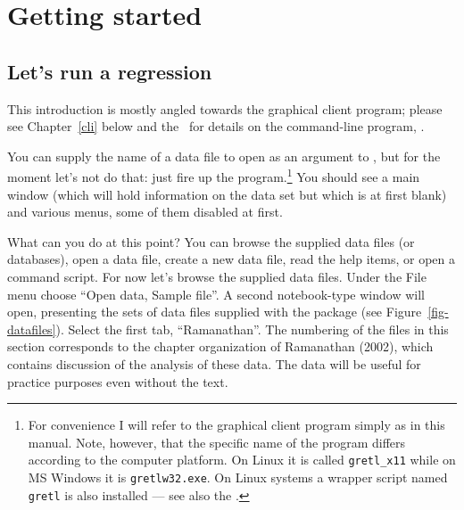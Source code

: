 \chapter{Getting started}
\label{getting-started}


\section{Let's run a regression}
\label{starting-regression}

This introduction is mostly angled towards the graphical client
program; please see Chapter~\ref{cli} below and the \GCR\ for details
on the command-line program, .
    
You can supply the name of a data file to open as an argument to
, but for the moment let's not do that: just fire up the
program.\footnote{For convenience I will refer to the graphical client
  program simply as  in this manual. Note, however, that
  the specific name of the program differs according to the computer
  platform.  On Linux it is called \verb+gretl_x11+ while on MS
  Windows it is \verb+gretlw32.exe+. On Linux systems a wrapper script
  named \verb+gretl+ is also installed --- see also the \GCR.}  You
should see a main window (which will hold information on the data set
but which is at first blank) and various menus, some of them disabled
at first.
    
What can you do at this point?  You can browse the supplied data files
(or databases), open a data file, create a new data file, read the
help items, or open a command script.  For now let's browse the
supplied data files.  Under the File menu choose ``Open data, Sample
file''.  A second notebook-type window will open, presenting the sets
of data files supplied with the package (see
Figure~\ref{fig-datafiles}).  Select the first tab, ``Ramanathan''.
The numbering of the files in this section corresponds to the chapter
organization of Ramanathan (2002), which contains discussion of the
analysis of these data. The data will be useful for practice purposes
even without the text.
    
